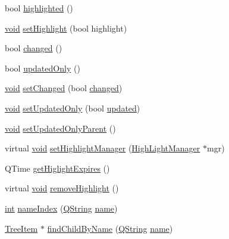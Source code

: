 \begin{DoxyCompactItemize}
\item 
bool \hyperlink{group___u_a_v_object_browser_plugin_ga47c7c59b2ed66695e9c42351fbeb24b2}{highlighted} ()
\item 
\hyperlink{group___u_a_v_objects_plugin_ga444cf2ff3f0ecbe028adce838d373f5c}{void} \hyperlink{group___u_a_v_object_browser_plugin_ga59e306591cb8099a247f47cde3e4e78a}{set\-Highlight} (bool highlight)
\item 
bool \hyperlink{group___u_a_v_object_browser_plugin_ga092f37d4eb04a9889985eadb5066ff6e}{changed} ()
\item 
bool \hyperlink{group___u_a_v_object_browser_plugin_gae407428df05b1f28bcb6e8bf2cd86b73}{updated\-Only} ()
\item 
\hyperlink{group___u_a_v_objects_plugin_ga444cf2ff3f0ecbe028adce838d373f5c}{void} \hyperlink{group___u_a_v_object_browser_plugin_ga2562126b279261daaf87d6234bfb807c}{set\-Changed} (bool \hyperlink{group___u_a_v_object_browser_plugin_ga092f37d4eb04a9889985eadb5066ff6e}{changed})
\item 
\hyperlink{group___u_a_v_objects_plugin_ga444cf2ff3f0ecbe028adce838d373f5c}{void} \hyperlink{group___u_a_v_object_browser_plugin_ga63e16f896af89aa165dcd9c31d42ce83}{set\-Updated\-Only} (bool \hyperlink{_parse_e_k_f_log_8m_ae27e566dc7dcd1f77211f8374e4b017a}{updated})
\item 
\hyperlink{group___u_a_v_objects_plugin_ga444cf2ff3f0ecbe028adce838d373f5c}{void} \hyperlink{group___u_a_v_object_browser_plugin_gae74eb4785ae705b5a9ffc056a71fb88a}{set\-Updated\-Only\-Parent} ()
\item 
virtual \hyperlink{group___u_a_v_objects_plugin_ga444cf2ff3f0ecbe028adce838d373f5c}{void} \hyperlink{group___u_a_v_object_browser_plugin_gac523fe360648e1e148c4b30f6918c6be}{set\-Highlight\-Manager} (\hyperlink{class_high_light_manager}{High\-Light\-Manager} $\ast$mgr)
\item 
Q\-Time \hyperlink{group___u_a_v_object_browser_plugin_gabc3b5a703ec23600e388018db3349369}{get\-Higlight\-Expires} ()
\item 
virtual \hyperlink{group___u_a_v_objects_plugin_ga444cf2ff3f0ecbe028adce838d373f5c}{void} \hyperlink{group___u_a_v_object_browser_plugin_ga9620f3abc5fda75861a24032594766a6}{remove\-Highlight} ()
\item 
\hyperlink{ioapi_8h_a787fa3cf048117ba7123753c1e74fcd6}{int} \hyperlink{group___u_a_v_object_browser_plugin_gac2b731cbaed396ea1819b12ddb0f7767}{name\-Index} (\hyperlink{group___u_a_v_objects_plugin_gab9d252f49c333c94a72f97ce3105a32d}{Q\-String} \hyperlink{glext_8h_ad977737dfc9a274a62741b9500c49a32}{name})
\item 
\hyperlink{class_tree_item}{Tree\-Item} $\ast$ \hyperlink{group___u_a_v_object_browser_plugin_ga17e124da1542c7dab530add7dce6d170}{find\-Child\-By\-Name} (\hyperlink{group___u_a_v_objects_plugin_gab9d252f49c333c94a72f97ce3105a32d}{Q\-String} \hyperlink{glext_8h_ad977737dfc9a274a62741b9500c49a32}{name})
\end{DoxyCompactItemize}
